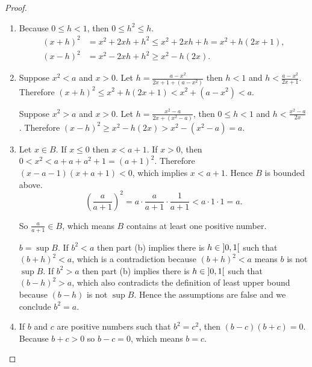 \begin{proof}
    \begin{enumerate}[label={(\alph*)}]
        \item Because $0\leq h < 1$, then $0\leq h^{2} \leq h$.
              \begin{align*}
                  {(x + h)}^{2} & = x^{2} + 2xh + h^{2} \leq x^{2} + 2xh + h = x^{2} + h(2x + 1), \\
                  {(x - h)}^{2} & = x^{2} - 2xh + h^{2} \geq x^{2} - h(2x).
              \end{align*}
        \item Suppose $x^{2} < a$ and $x > 0$. Let $h = \frac{a - x^{2}}{2x + 1 + (a - x^{2})}$ then $h < 1$ and $h < \frac{a - x^{2}}{2x + 1}$. Therefore ${(x + h)}^{2}\leq x^{2} + h(2x + 1) < x^{2} + (a - x^{2}) < a$.

              Suppose $x^{2} > a$ and $x > 0$. Let $h = \frac{x^{2} - a}{2x + (x^{2} - a)}$, then $0\leq h < 1$ and $h < \frac{x^{2} - a}{2x}$. Therefore ${(x - h)}^{2}\geq x^{2} - h(2x) > x^{2} - (x^{2} - a) = a$.
        \item Let $x\in B$. If $x\leq 0$ then $x < a + 1$. If $x > 0$, then $0 < x^{2} < a + a + a^{2} + 1 = {(a + 1)}^{2}$. Therefore $(x - a - 1)(x + a + 1) < 0$, which implies $x < a + 1$. Hence $B$ is bounded above.
              \[
                  {\left(\frac{a}{a + 1}\right)}^{2} = a\cdot \frac{a}{a+1}\cdot\frac{1}{a + 1} < a\cdot 1\cdot 1 = a.
              \]

              So $\frac{a}{a + 1}\in B$, which means $B$ contains at least one positive number.

              $b = \sup B$. If $b^{2} < a$ then part (b) implies there is $h\in\left]{0, 1}\right[$ such that ${(b + h)}^{2} < a$, which is a contradiction because ${(b + h)}^{2} < a$ means $b$ is not $\sup B$. If $b^{2} > a$ then part (b) implies there is $h\in\left]{0, 1}\right[$ such that ${(b - h)}^{2} > a$, which also contradicts the definition of least upper bound because $(b - h)$ is not $\sup B$. Hence the assumptions are false and we conclude $b^{2} = a$.
        \item If $b$ and $c$ are positive numbers such that $b^{2} = c^{2}$, then $(b - c)(b + c) = 0$. Because $b + c > 0$ so $b - c = 0$, which means $b = c$.
    \end{enumerate}
\end{proof}

